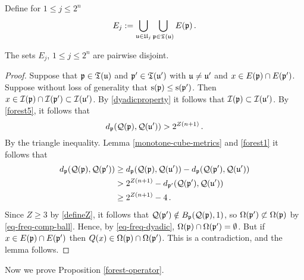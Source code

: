 {Define for $1 \le j \le 2^n$
$$
    E_j := \bigcup_{{\mathfrak u} \in {\mathfrak U}_j} \bigcup_{{\mathfrak p} \in {\mathfrak T}({\mathfrak u})} E({\mathfrak p})\,.
$$

\begin{lemma}
    \label{disjoint-row-support}
    The sets $E_j$, $1 \le j \le 2^n$ are pairwise disjoint.
\end{lemma}

\begin{proof}
    Suppose that ${\mathfrak p} \in {\mathfrak T}({\mathfrak u})$ and ${\mathfrak p}' \in {\mathfrak T}({\mathfrak u}')$ with ${\mathfrak u} \ne {\mathfrak u}'$ and $x \in E({\mathfrak p}) \cap E({\mathfrak p}')$. Suppose without loss of generality that ${\mathrm{s}}({\mathfrak p}) \le {\mathrm{s}}({\mathfrak p}')$. Then $x \in {\mathcal{I}}({\mathfrak p}) \cap {\mathcal{I}}({\mathfrak p}') \subset {\mathcal{I}}({\mathfrak u}')$. By \eqref{dyadicproperty} it follows that ${\mathcal{I}}({\mathfrak p}) \subset {\mathcal{I}}({\mathfrak u}')$. By \eqref{forest5}, it follows that
    $$
        d_{{\mathfrak p}}({\mathcal{Q}}({\mathfrak p}), {\mathcal{Q}}({\mathfrak u}')) > 2^{Z(n+1)}\,.
    $$
    By the triangle inequality. Lemma \ref{monotone-cube-metrics} and \eqref{forest1} it follows that
    \begin{align*}
        d_{{\mathfrak p}}({\mathcal{Q}}({\mathfrak p}), {\mathcal{Q}}({\mathfrak p}')) &\ge d_{{\mathfrak p}}({\mathcal{Q}}({\mathfrak p}), {\mathcal{Q}}({\mathfrak u}')) - d_{{\mathfrak p}}({\mathcal{Q}}({\mathfrak p}'), {\mathcal{Q}}({\mathfrak u}'))\\
        &> 2^{Z(n+1)} - d_{{\mathfrak p}'}({\mathcal{Q}}({\mathfrak p}'), {\mathcal{Q}}({\mathfrak u}'))\\
        &\ge 2^{Z(n+1)} - 4\,.
    \end{align*}
    Since $Z \ge 3$ by \eqref{defineZ}, it follows that ${\mathcal{Q}}({\mathfrak p}') \notin B_{{\mathfrak p}}({\mathcal{Q}}({\mathfrak p}), 1)$, so $\Omega({\mathfrak p}') \not\subset \Omega({\mathfrak p})$ by \eqref{eq-freq-comp-ball}. Hence, by \eqref{eq-freq-dyadic}, $\Omega({\mathfrak p}) \cap \Omega({\mathfrak p}') = \emptyset$. But if $x \in E({\mathfrak p}) \cap E({\mathfrak p}')$ then $Q(x) \in \Omega({\mathfrak p}) \cap \Omega({\mathfrak p}')$. This is a contradiction, and the lemma follows.
\end{proof}

Now we prove Proposition \ref{forest-operator}.

}

